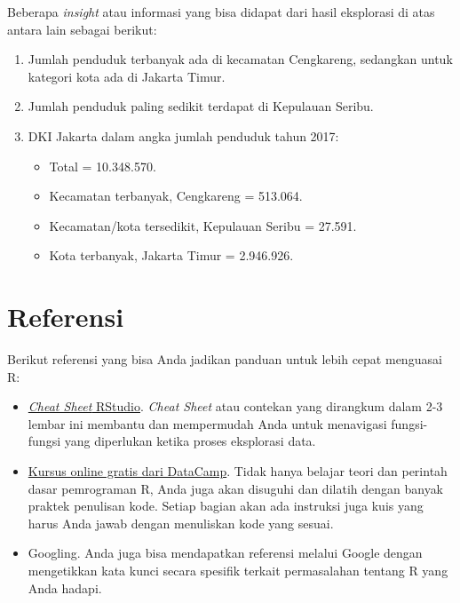 \documentclass[openany]{book}
\providecommand{\tightlist}{%
  \setlength{\itemsep}{0pt}\setlength{\parskip}{0pt}}
\begin{document}
Beberapa \emph{insight} atau informasi yang bisa didapat dari hasil
eksplorasi di atas antara lain sebagai berikut:

\begin{enumerate}
\def\labelenumi{\arabic{enumi}.}
\tightlist
\item
  Jumlah penduduk terbanyak ada di kecamatan Cengkareng, sedangkan untuk
  kategori kota ada di Jakarta Timur.
\item
  Jumlah penduduk paling sedikit terdapat di Kepulauan Seribu.
\item
  DKI Jakarta dalam angka jumlah penduduk tahun 2017:

  \begin{itemize}
  \tightlist
  \item
    Total = 10.348.570.
  \item
    Kecamatan terbanyak, Cengkareng = 513.064.
  \item
    Kecamatan/kota tersedikit, Kepulauan Seribu = 27.591.
  \item
    Kota terbanyak, Jakarta Timur = 2.946.926.
  \end{itemize}
\end{enumerate}

\section{Referensi}\label{referensi}

Berikut referensi yang bisa Anda jadikan panduan untuk lebih cepat
menguasai R:

\begin{itemize}
\item
  \href{https://www.rstudio.com/resources/cheatsheets/}{\emph{Cheat
  Sheet} RStudio}. \emph{Cheat Sheet} atau contekan yang dirangkum dalam
  2-3 lembar ini membantu dan mempermudah Anda untuk menavigasi
  fungsi-fungsi yang diperlukan ketika proses eksplorasi data.
\item
  \href{https://www.datacamp.com/courses/free-introduction-to-r}{Kursus
  online gratis dari DataCamp}. Tidak hanya belajar teori dan perintah
  dasar pemrograman R, Anda juga akan disuguhi dan dilatih dengan banyak
  praktek penulisan kode. Setiap bagian akan ada instruksi juga kuis
  yang harus Anda jawab dengan menuliskan kode yang sesuai.
\item
  Googling. Anda juga bisa mendapatkan referensi melalui Google dengan
  mengetikkan kata kunci secara spesifik terkait permasalahan tentang R
  yang Anda hadapi.
\end{itemize}
\end{document}
